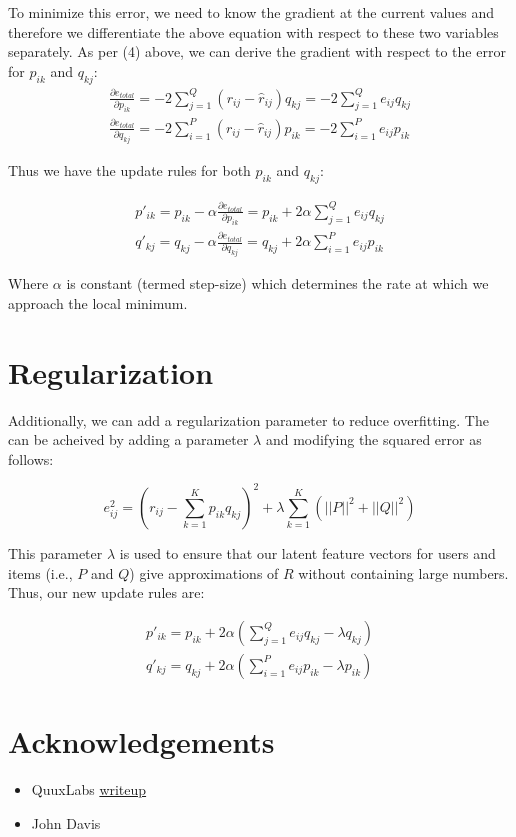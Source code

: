 \documentclass[12pt,reqno]{article}
\begin{document}
To minimize this error, we need to know the gradient at the current values and
therefore we differentiate the above equation with respect to these two
variables separately. As per (4) above, we can derive the gradient with respect
to the error for $p_{ik}$ and $q_{kj}$:
\begin{align}
  \frac{\partial e_{total}}{\partial p_{ik}} = -2\sum_{j=1}^{Q}(r_{ij} -
\hat{r}_{ij})q_{kj} = -2\sum_{j=1}^{Q}e_{ij}q_{kj} \\
  \frac{\partial e_{total}}{\partial q_{kj}} = -2\sum_{i=1}^{P}(r_{ij} -
\hat{r}_{ij})p_{ik} = -2\sum_{i=1}^{P}e_{ij}p_{ik}
\end{align}

Thus we have the update rules for both $p_{ik}$ and $q_{kj}$:

\begin{align}
  p'_{ik} = p_{ik} - \alpha\frac{\partial e_{total}}{\partial p_{ik}}
= p_{ik} + 2\alpha\sum_{j=1}^{Q}e_{ij}q_{kj} \\
  q'_{kj} = q_{kj} - \alpha\frac{\partial e_{total}}{\partial q_{kj}}
= q_{kj} + 2\alpha\sum_{i=1}^{P}e_{ij}p_{ik}
\end{align}

Where $\alpha$ is constant (termed step-size) which determines the rate at which
we approach the local minimum.

\section{Regularization}
Additionally, we can add a regularization parameter to reduce overfitting. The
can be acheived by adding a parameter $\lambda$ and modifying the squared error
as follows:

\begin{equation}
  e_{ij}^2 = (r_{ij} - \sum_{k=1}^{K}p_{ik} q_{kj})^2 + 
\lambda\sum_{k=1}^{K}(||P||^2 + ||Q||^2)
\end{equation}

This parameter $\lambda$ is used to ensure that our latent feature vectors for
users and items (i.e., $P$ and $Q$) give approximations of $R$ without
containing large numbers. Thus, our new update rules are:

\begin{align}
  p'_{ik} = p_{ik} + 2\alpha(\sum_{j=1}^{Q}e_{ij}q_{kj} - \lambda q_{kj}) \\
  q'_{kj} = q_{kj} + 2\alpha(\sum_{i=1}^{P}e_{ij}p_{ik} - \lambda p_{ik})
\end{align}

\section{Acknowledgements}
\begin{itemize}
\item QuuxLabs \href{http://www.quuxlabs.com/blog/2010/09/matrix-factorization-a-simple-tutorial-and-implementation-in-python/}{writeup}
\item John Davis
\end{itemize}
\end{document}
